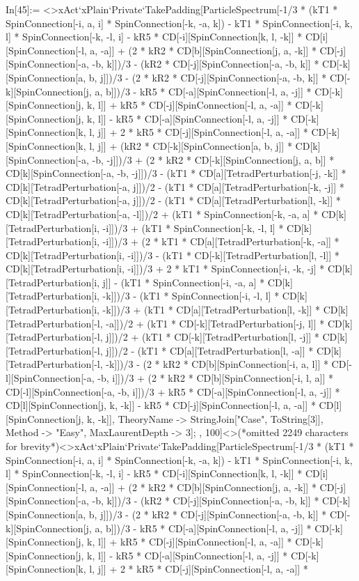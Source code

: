 In[45]:= <>xAct`xPlain`Private`TakePadding[ParticleSpectrum[-1/3 * (kT1 * SpinConnection[-i, a, i] * SpinConnection[-k, -a, k]) - kT1 * SpinConnection[-i, k, l] * SpinConnection[-k, -l, i] - kR5 * CD[-i][SpinConnection[k, l, -k]] * CD[i][SpinConnection[-l, a, -a]] + (2 * kR2 * CD[b][SpinConnection[j, a, -k]] * CD[-j][SpinConnection[-a, -b, k]])/3 - (kR2 * CD[-j][SpinConnection[-a, -b, k]] * CD[-k][SpinConnection[a, b, j]])/3 - (2 * kR2 * CD[-j][SpinConnection[-a, -b, k]] * CD[-k][SpinConnection[j, a, b]])/3 - kR5 * CD[-a][SpinConnection[-l, a, -j]] * CD[-k][SpinConnection[j, k, l]] + kR5 * CD[-j][SpinConnection[-l, a, -a]] * CD[-k][SpinConnection[j, k, l]] - kR5 * CD[-a][SpinConnection[-l, a, -j]] * CD[-k][SpinConnection[k, l, j]] + 2 * kR5 * CD[-j][SpinConnection[-l, a, -a]] * CD[-k][SpinConnection[k, l, j]] + (kR2 * CD[-k][SpinConnection[a, b, j]] * CD[k][SpinConnection[-a, -b, -j]])/3 + (2 * kR2 * CD[-k][SpinConnection[j, a, b]] * CD[k][SpinConnection[-a, -b, -j]])/3 - (kT1 * CD[a][TetradPerturbation[-j, -k]] * CD[k][TetradPerturbation[-a, j]])/2 - (kT1 * CD[a][TetradPerturbation[-k, -j]] * CD[k][TetradPerturbation[-a, j]])/2 - (kT1 * CD[a][TetradPerturbation[l, -k]] * CD[k][TetradPerturbation[-a, -l]])/2 + (kT1 * SpinConnection[-k, -a, a] * CD[k][TetradPerturbation[i, -i]])/3 + (kT1 * SpinConnection[-k, -l, l] * CD[k][TetradPerturbation[i, -i]])/3 + (2 * kT1 * CD[a][TetradPerturbation[-k, -a]] * CD[k][TetradPerturbation[i, -i]])/3 - (kT1 * CD[-k][TetradPerturbation[l, -l]] * CD[k][TetradPerturbation[i, -i]])/3 + 2 * kT1 * SpinConnection[-i, -k, -j] * CD[k][TetradPerturbation[i, j]] - (kT1 * SpinConnection[-i, -a, a] * CD[k][TetradPerturbation[i, -k]])/3 - (kT1 * SpinConnection[-i, -l, l] * CD[k][TetradPerturbation[i, -k]])/3 + (kT1 * CD[a][TetradPerturbation[l, -k]] * CD[k][TetradPerturbation[-l, -a]])/2 + (kT1 * CD[-k][TetradPerturbation[-j, l]] * CD[k][TetradPerturbation[-l, j]])/2 + (kT1 * CD[-k][TetradPerturbation[l, -j]] * CD[k][TetradPerturbation[-l, j]])/2 - (kT1 * CD[a][TetradPerturbation[l, -a]] * CD[k][TetradPerturbation[-l, -k]])/3 - (2 * kR2 * CD[b][SpinConnection[-i, a, l]] * CD[-l][SpinConnection[-a, -b, i]])/3 + (2 * kR2 * CD[b][SpinConnection[-i, l, a]] * CD[-l][SpinConnection[-a, -b, i]])/3 + kR5 * CD[-a][SpinConnection[-l, a, -j]] * CD[l][SpinConnection[j, k, -k]] - kR5 * CD[-j][SpinConnection[-l, a, -a]] * CD[l][SpinConnection[j, k, -k]], TheoryName -> StringJoin["Case", ToString[3]], Method -> "Easy", MaxLaurentDepth -> 3]; , 100]<>(*omitted 2249 characters for brevity*)<>xAct`xPlain`Private`TakePadding[ParticleSpectrum[-1/3 * (kT1 * SpinConnection[-i, a, i] * SpinConnection[-k, -a, k]) - kT1 * SpinConnection[-i, k, l] * SpinConnection[-k, -l, i] - kR5 * CD[-i][SpinConnection[k, l, -k]] * CD[i][SpinConnection[-l, a, -a]] + (2 * kR2 * CD[b][SpinConnection[j, a, -k]] * CD[-j][SpinConnection[-a, -b, k]])/3 - (kR2 * CD[-j][SpinConnection[-a, -b, k]] * CD[-k][SpinConnection[a, b, j]])/3 - (2 * kR2 * CD[-j][SpinConnection[-a, -b, k]] * CD[-k][SpinConnection[j, a, b]])/3 - kR5 * CD[-a][SpinConnection[-l, a, -j]] * CD[-k][SpinConnection[j, k, l]] + kR5 * CD[-j][SpinConnection[-l, a, -a]] * CD[-k][SpinConnection[j, k, l]] - kR5 * CD[-a][SpinConnection[-l, a, -j]] * CD[-k][SpinConnection[k, l, j]] + 2 * kR5 * CD[-j][SpinConnection[-l, a, -a]] * 